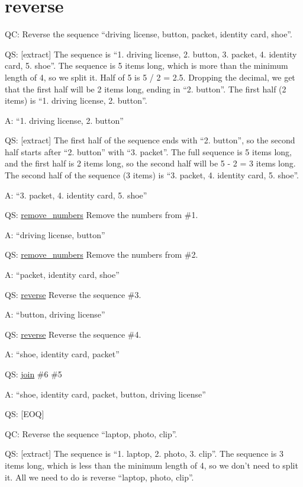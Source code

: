 \documentclass[
]{article}
\begin{document}
\section{reverse}\label{reverse}

QC: Reverse the sequence ``driving license, button, packet, identity
card, shoe''.

QS: {[}extract{]} The sequence is ``1. driving license, 2. button, 3.
packet, 4. identity card, 5. shoe''. The sequence is 5 items long, which
is more than the minimum length of 4, so we split it. Half of 5 is 5 / 2
= 2.5. Dropping the decimal, we get that the first half will be 2 items
long, ending in ``2. button''. The first half (2 items) is ``1. driving
license, 2. button''.

A: ``1. driving license, 2. button''

QS: {[}extract{]} The first half of the sequence ends with ``2.
button'', so the second half starts after ``2. button'' with ``3.
packet''. The full sequence is 5 items long, and the first half is 2
items long, so the second half will be 5 - 2 = 3 items long. The second
half of the sequence (3 items) is ``3. packet, 4. identity card, 5.
shoe''.

A: ``3. packet, 4. identity card, 5. shoe''

QS: \hyperref[remove_numbers]{remove\_numbers} Remove the numbers from
\#1.

A: ``driving license, button''

QS: \hyperref[remove_numbers]{remove\_numbers} Remove the numbers from
\#2.

A: ``packet, identity card, shoe''

QS: \hyperref[reverse]{reverse} Reverse the sequence \#3.

A: ``button, driving license''

QS: \hyperref[reverse]{reverse} Reverse the sequence \#4.

A: ``shoe, identity card, packet''

QS: \hyperref[join]{join} \#6 \#5

A: ``shoe, identity card, packet, button, driving license''

QS: {[}EOQ{]}

QC: Reverse the sequence ``laptop, photo, clip''.

QS: {[}extract{]} The sequence is ``1. laptop, 2. photo, 3. clip''. The
sequence is 3 items long, which is less than the minimum length of 4, so
we don't need to split it. All we need to do is reverse ``laptop, photo,
clip''.
\end{document}
